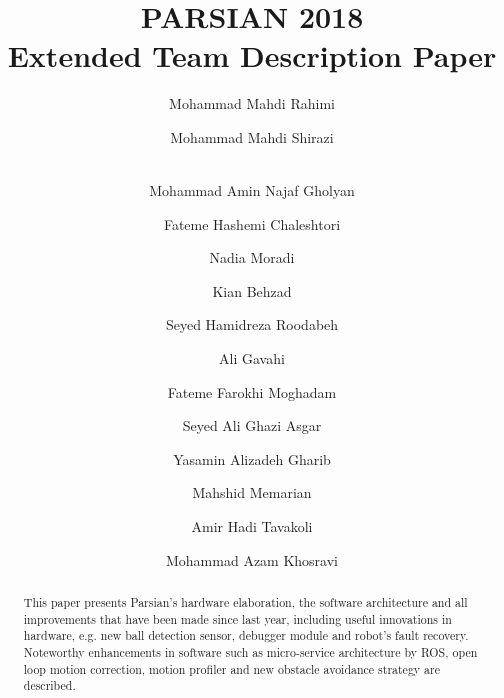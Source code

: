 \documentclass{llncs}
\begin{document}
\title{PARSIAN 2018\\Extended Team Description Paper}
%
%
\author{Mohammad Mahdi Rahimi \and Mohammad Mahdi Shirazi \and \\
Mohammad Amin Najaf Gholyan \and Fateme Hashemi Chaleshtori\and Nadia Moradi \and Kian Behzad \and Seyed Hamidreza Roodabeh \and Ali Gavahi \and Fateme Farokhi Moghadam  \and Seyed Ali Ghazi Asgar \and Yasamin Alizadeh Gharib\and Mahshid Memarian \and Amir Hadi Tavakoli \and Mohammad Azam Khosravi}
%
%
%

\maketitle              %

\begin{abstract}
This paper presents Parsian's hardware elaboration, the software architecture and all improvements that have been made since last year, including useful innovations in hardware, e.g. new ball detection sensor, debugger module and robot's fault recovery. Noteworthy enhancements in software such as micro-service architecture by ROS, open loop motion correction, motion profiler and new obstacle avoidance strategy are described.



\end{abstract}
%
\end{document}
